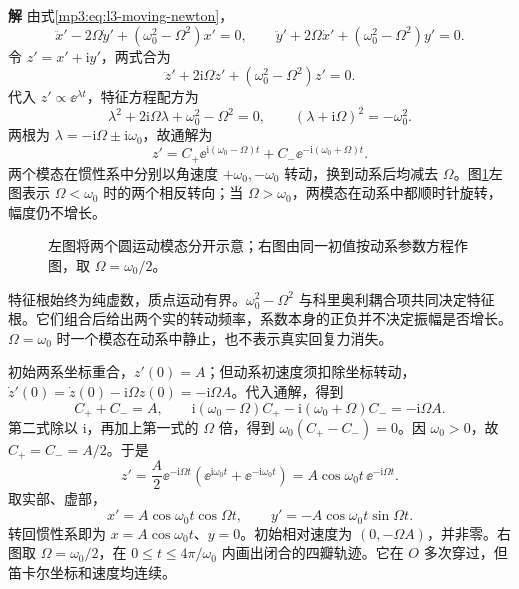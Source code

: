 \documentclass[11pt,openany,fontset=fandol]{ctexbook}
\theoremstyle{definition}\newtheorem{example}{例}[chapter]\newtheorem{exercise}{习题}[chapter]
\newcommand{\SolutionStart}{\par\medskip\ifdim\pagetotal>0pt\ifdim\dimexpr\pagegoal-\pagetotal\relax<3\baselineskip\newpage\fi\fi\noindent\textbf{解}\quad\ignorespaces}
\newenvironment{solution}{\SolutionStart}{\par\medskip}
\begin{document}
\begin{solution}
由式\eqref{mp3:eq:l3-moving-newton}，
\[
\ddot x'-2\Omega\dot y'+(\omega_0^2-\Omega^2)x'=0,\qquad
\ddot y'+2\Omega\dot x'+(\omega_0^2-\Omega^2)y'=0.
\]
令 $z'=x'+\mathrm i y'$，两式合为
\[
\ddot z'+2\mathrm i\Omega\dot z'+(\omega_0^2-\Omega^2)z'=0.
\]
代入 $z'\propto\ee^{\lambda t}$，特征方程配方为
\[
\lambda^2+2\mathrm i\Omega\lambda+\omega_0^2-\Omega^2=0,
\qquad (\lambda+\mathrm i\Omega)^2=-\omega_0^2.
\]
两根为 $\lambda=-\mathrm i\Omega\pm\mathrm i\omega_0$，故通解为
\[
z'=C_+\ee^{\mathrm i(\omega_0-\Omega)t}
+C_-\ee^{-\mathrm i(\omega_0+\Omega)t}.
\]
两个模态在惯性系中分别以角速度 $+\omega_0,-\omega_0$ 转动，换到动系后均减去 $\Omega$。图\ref{mp3:fig:l3-p12-s}左图表示 $\Omega<\omega_0$ 时的两个相反转向；当 $\Omega>\omega_0$，两模态在动系中都顺时针旋转，幅度仍不增长。

\begin{figure}[H]\centering
{}
\caption{左图将两个圆运动模态分开示意；右图由同一初值按动系参数方程作图，取 $\Omega=\omega_0/2$。}\label{mp3:fig:l3-p12-s}
\end{figure}


特征根始终为纯虚数，质点运动有界。$\omega_0^2-\Omega^2$ 与科里奥利耦合项共同决定特征根。它们组合后给出两个实的转动频率，系数本身的正负并不决定振幅是否增长。$\Omega=\omega_0$ 时一个模态在动系中静止，也不表示真实回复力消失。

初始两系坐标重合，$z'(0)=A$；但动系初速度须扣除坐标转动，$\dot z'(0)=\dot z(0)-\mathrm i\Omega z(0)=-\mathrm i\Omega A$。代入通解，得到
\[
C_++C_-=A,\qquad
\mathrm i(\omega_0-\Omega)C_+-\mathrm i(\omega_0+\Omega)C_-=-\mathrm i\Omega A.
\]
第二式除以 $\mathrm i$，再加上第一式的 $\Omega$ 倍，得到 $\omega_0(C_+-C_-)=0$。因 $\omega_0>0$，故 $C_+=C_-=A/2$。于是
\[
z'=\frac A2\ee^{-\mathrm i\Omega t}(\ee^{\mathrm i\omega_0t}+\ee^{-\mathrm i\omega_0t})
=A\cos\omega_0t\,\ee^{-\mathrm i\Omega t}.
\]
取实部、虚部，
\[
x'=A\cos\omega_0t\cos\Omega t,\qquad
y'=-A\cos\omega_0t\sin\Omega t.
\]
转回惯性系即为 $x=A\cos\omega_0t$、$y=0$。初始相对速度为 $(0,-\Omega A)$，并非零。右图取 $\Omega=\omega_0/2$，在 $0\le t\le4\pi/\omega_0$ 内画出闭合的四瓣轨迹。它在 $O$ 多次穿过，但笛卡尔坐标和速度均连续。

\end{solution}
\end{document}

